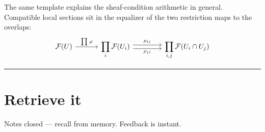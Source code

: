 The same template explains the sheaf-condition arithmetic in general. Compatible local sections
sit in the equalizer of the two restriction maps to the overlaps:
\[
\begin{tikzcd}[ampersand replacement=\&,column sep=large]
\sF(U)\ar[r,"{\prod\,\rho}"] \&[-1ex]
  \displaystyle\prod_i \sF(U_i)
  \ar[r,shift left=0.6ex,"\rho_{ij}"]\ar[r,shift right=0.6ex,swap,"\rho_{ji}"] \&[1ex]
  \displaystyle\prod_{i,j}\sF(U_i\cap U_j)
\end{tikzcd}
\]

\bigskip
\hrule
\bigskip

\section{Retrieve it}
Notes closed --- recall from memory. Feedback is instant.

